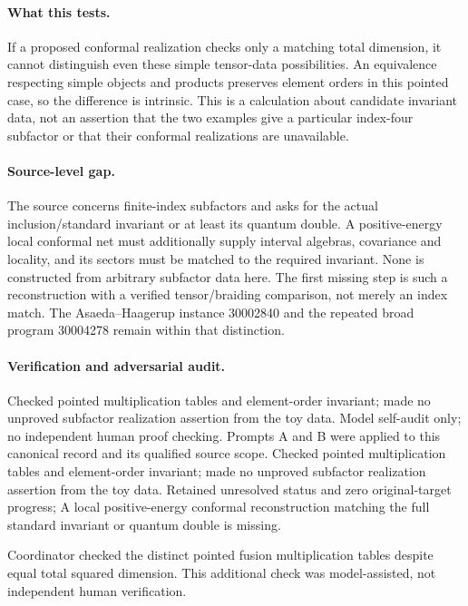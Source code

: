 \documentclass[11pt]{article}
\begin{document}
\paragraph{What this tests.} If a proposed conformal realization checks only a matching total dimension, it cannot distinguish even these simple tensor-data possibilities. An equivalence respecting simple objects and products preserves element orders in this pointed case, so the difference is intrinsic. This is a calculation about candidate invariant data, not an assertion that the two examples give a particular index-four subfactor or that their conformal realizations are unavailable.

\paragraph{Source-level gap.} The source concerns finite-index subfactors and asks for the actual inclusion/standard invariant or at least its quantum double. A positive-energy local conformal net must additionally supply interval algebras, covariance and locality, and its sectors must be matched to the required invariant. None is constructed from arbitrary subfactor data here. The first missing step is such a reconstruction with a verified tensor/braiding comparison, not merely an index match. The Asaeda--Haagerup instance 30002840 and the repeated broad program 30004278 remain within that distinction.

\paragraph{Verification and adversarial audit.}
Checked pointed multiplication tables and element-order invariant; made no unproved subfactor realization assertion from the toy data. Model self-audit only; no independent human proof checking. Prompts A and B were applied to this canonical record and its qualified source scope. Checked pointed multiplication tables and element-order invariant; made no unproved subfactor realization assertion from the toy data. Retained unresolved status and zero original-target progress; A local positive-energy conformal reconstruction matching the full standard invariant or quantum double is missing.

Coordinator checked the distinct pointed fusion multiplication tables despite equal total squared dimension. This additional check was model-assisted, not independent human verification.
\end{document}
